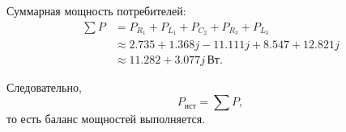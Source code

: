 \documentclass[12pt,a4paper]{article}
\newcommand{\VA}{\,\text{Вт}}
\begin{document}
Суммарная мощность потребителей:
\begin{equation*}
\begin{aligned}
\sum P &= P_{R_1} + P_{L_1} + P_{C_2} + P_{R_3} + P_{L_3} \\
&\approx 2.735 + 1.368j - 11.111j + 8.547 + 12.821j \\
&\approx 11.282 + 3.077j\VA.
\end{aligned}
\end{equation*}

Следовательно,
\[
P_{\text{ист}} = \sum P,
\]
то есть баланс мощностей выполняется.
\end{document}

